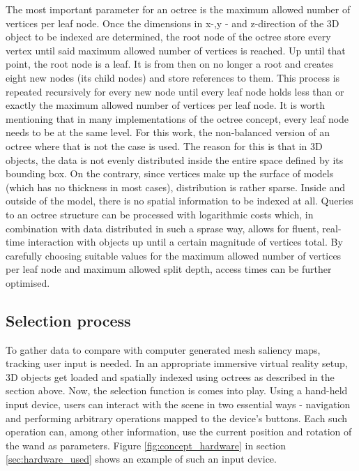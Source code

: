 The most important parameter for an octree is the maximum allowed number of vertices per leaf node. Once the dimensions in x-,y - and z-direction of the 3D object to be indexed are determined, the root node of the octree store every vertex until said maximum allowed number of vertices is reached. Up until that point, the root node is a leaf. It is from then on no longer a root and creates eight new nodes (its child nodes) and store references to them. This process is repeated recursively for every new node until every leaf node holds less than or exactly the maximum allowed number of vertices per leaf node. It is worth mentioning that in many implementations of the octree concept, every leaf node needs to be at the same level. For this work, the non-balanced version of an octree where that is not the case is used. The reason for this is that in 3D objects, the data is not evenly distributed inside the entire space defined by its bounding box. On the contrary, since vertices make up the surface of models (which has no thickness in most cases), distribution is rather sparse. Inside and outside of the model, there is no spatial information to be indexed at all. Queries to an octree structure can be processed with logarithmic costs which, in combination with data distributed in such a sprase way, allows for fluent, real-time interaction with objects up until a certain magnitude of vertices total. By carefully choosing suitable values for the maximum allowed number of vertices per leaf node and maximum allowed split depth, access times can be further optimised.

		\subsection{Selection process}
		\label{sec:selection_process}

To gather data to compare with computer generated mesh saliency maps, tracking user input is needed. In an appropriate immersive virtual reality setup, 3D objects get loaded and spatially indexed using octrees as described in the section above. Now, the selection function is comes into play. Using a hand-held input device, users can interact with the scene in two essential ways - navigation and performing arbitrary operations mapped to the device's buttons. Each such operation can, among other information, use the current position and rotation of the wand as parameters. Figure \ref{fig:concept_hardware} in section \ref{sec:hardware_used} shows an example of such an input device.

